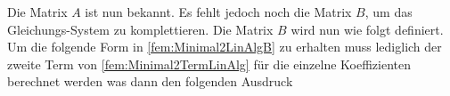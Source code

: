 Die Matrix $A$ ist nun bekannt. Es fehlt jedoch noch die Matrix $B$, um das Gleichungs-System zu komplettieren. Die Matrix $B$ wird nun wie folgt definiert. Um die folgende Form in \eqref{fem:Minimal2LinAlgB} zu erhalten muss lediglich der zweite Term von \eqref{fem:Minimal2TermLinAlg} für die einzelne Koeffizienten berechnet werden was dann den folgenden Ausdruck

